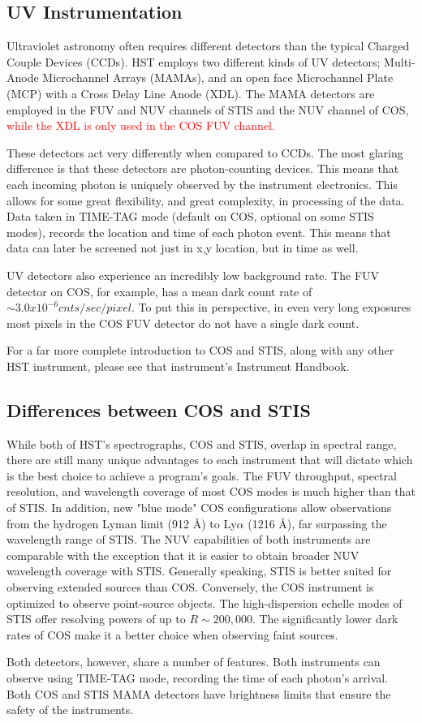 \subsection{UV Instrumentation}
Ultraviolet astronomy often requires different detectors than the typical Charged Couple Devices (CCDs).  HST employs two different kinds of UV detectors; Multi-Anode Microchannel Arrays (MAMAs), and an open face Microchannel Plate (MCP) with a Cross Delay Line Anode (XDL).  The MAMA detectors are employed in the FUV and NUV channels of STIS and the NUV channel of COS, \textcolor{red}{while the XDL is only used in the COS FUV channel.} 

These detectors act very differently when compared to CCDs.  The most glaring difference is that these detectors are photon-counting devices.  This means that each incoming photon is uniquely observed by the instrument electronics.  This allows for some great flexibility, and great complexity, in processing of the data.  Data taken in TIME-TAG mode (default on COS, optional on some STIS modes), records the location and time of each photon event.  This means that data can later be screened not just in x,y location, but in time as well.  

UV detectors also experience an incredibly low background rate.  The FUV detector on COS, for example, has a mean dark count rate of $\sim 3.0x10^{-6} cnts/sec/pixel$.   To put this in perspective, in even very long exposures most pixels in the COS FUV detector do not have a single dark count.  

For a far more complete introduction to COS and STIS, along with any other HST instrument, please see that instrument's Instrument Handbook.

\subsection{Differences between COS and STIS}
While both of HST's spectrographs, COS and STIS, overlap in spectral range, there are still many unique advantages to each instrument that will dictate which is the best choice to achieve a program's goals. The FUV throughput, spectral resolution, and wavelength coverage of most COS modes is much higher than that of STIS. In addition, new "blue mode" COS configurations allow observations from the hydrogen Lyman limit (912 \AA) to Ly$\alpha$ (1216 \AA), far surpassing the wavelength range of STIS. The NUV capabilities of both instruments are comparable with the exception that it is easier to obtain broader NUV wavelength coverage with STIS. Generally speaking, STIS is better suited for observing extended sources than COS. Conversely, the COS instrument is optimized to observe point-source objects. The high-dispersion echelle modes of STIS offer resolving powers of up to $R \sim 200,000$. The significantly lower dark rates of COS make it a better choice when observing faint sources. 

Both detectors, however, share a number of features. Both instruments can observe using TIME-TAG mode, recording the time of each photon's arrival. Both COS and STIS MAMA detectors have brightness limits that ensure the safety of the instruments.